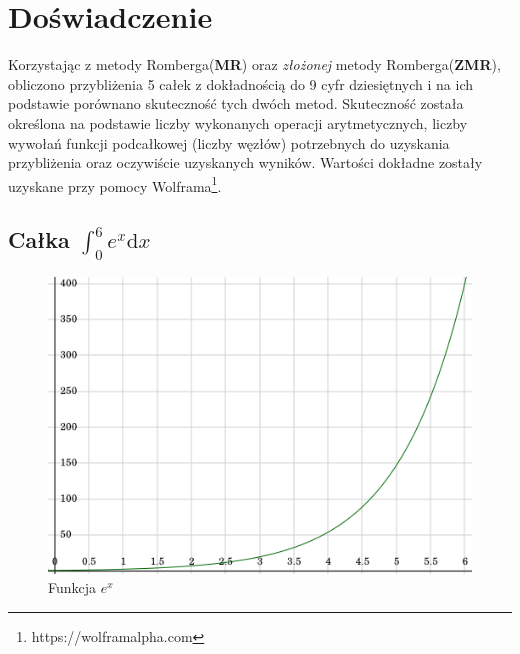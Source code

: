 \documentclass[11pt,leqno]{article}
\begin{document}
\section{Doświadczenie}\label{Doswiadczenie}
Korzystając z metody Romberga(\textbf{MR}) oraz \textit{złożonej} metody
Romberga(\textbf{ZMR}), obliczono przybliżenia 5 całek z dokładnością do 9 cyfr
dziesiętnych i na ich podstawie porównano skuteczność tych dwóch metod.
Skuteczność została określona na podstawie liczby wykonanych operacji
arytmetycznych, liczby wywołań funkcji podcałkowej (liczby węzłów) potrzebnych
do uzyskania przybliżenia oraz oczywiście uzyskanych wyników. Wartości dokładne
zostały uzyskane przy pomocy Wolframa\footnote{https://wolframalpha.com}.

\subsection{Całka $\int_{0}^{6}e^x\mathrm{d}x$}
\begin{center}\begin{figure}[ht]\begin{center}
    \caption{Funkcja $e^x$}
    \includegraphics[scale=0.3,angle=0]{ex.png}
\end{center}\end{figure}\end{center}
\end{document}
